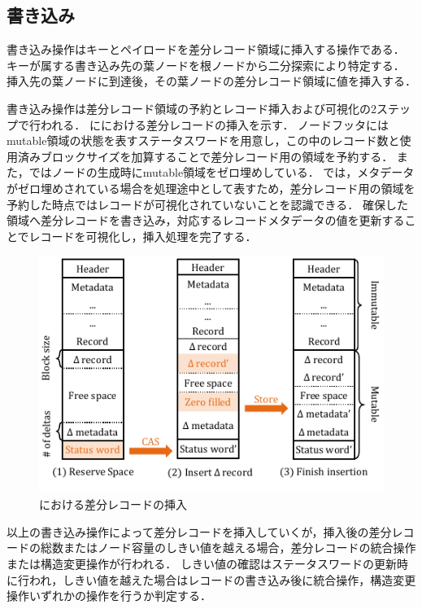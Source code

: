 \subsection{書き込み}

書き込み操作はキーとペイロードを差分レコード領域に挿入する操作である．
キーが属する書き込み先の葉ノードを根ノードから二分探索により特定する．
挿入先の葉ノードに到達後，その葉ノードの差分レコード領域に値を挿入する．

書き込み操作は差分レコード領域の予約とレコード挿入および可視化の2ステップで行われる．
\Fig{\ref{fig:bc_tree_insertion}}に\Bctree{}における差分レコードの挿入を示す．
ノードフッタにはmutable領域の状態を表すステータスワードを用意し，この中のレコード数と使用済みブロックサイズを加算することで差分レコード用の領域を予約する．
また，\Bctree{}ではノードの生成時にmutable領域をゼロ埋めしている．
\Bctree{}では，メタデータがゼロ埋めされている場合を処理途中として表すため，差分レコード用の領域を予約した時点ではレコードが可視化されていないことを認識できる．
確保した領域へ差分レコードを書き込み，対応するレコードメタデータの値を更新することでレコードを可視化し，挿入処理を完了する．

\begin{figure}[t]
    \centering
    \includegraphics{./figures/Bc-insertion.pdf}
    \caption{\Bctree{}における差分レコードの挿入}
    \label{fig:bc_tree_insertion}
\end{figure}

以上の書き込み操作によって差分レコードを挿入していくが，挿入後の差分レコードの総数またはノード容量のしきい値を越える場合，差分レコードの統合操作または構造変更操作が行われる．
しきい値の確認はステータスワードの更新時に行われ，しきい値を越えた場合はレコードの書き込み後に統合操作，構造変更操作いずれかの操作を行うか判定する．

